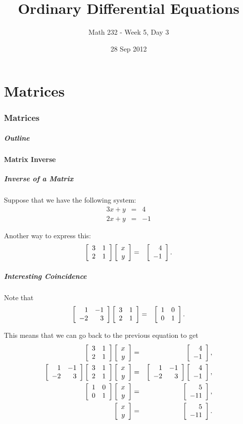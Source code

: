 \part{Matrices}
\section{Matrices}

\title{Ordinary Differential Equations}
\subtitle{Math 232 - Week 5, Day 3}
\date{28  Sep 2012}

\begin{frame}
  \titlepage
\end{frame}

\begin{frame}
  \frametitle{Outline}
\end{frame}


\subsection{Matrix Inverse}


\begin{frame}
  \frametitle{Inverse of a Matrix}

  Suppose that we have the following system:
  \begin{eqnarray*}
    3x + y & = & 4 \\
    2x + y & = & -1
  \end{eqnarray*}

  Another way to express this:
  \begin{eqnarray*}
    \arrayTwo{3}{1}{2}{1} \vecTwo{x}{y} & = & \vecTwo{4}{-1}.
  \end{eqnarray*}

\end{frame}


\begin{frame}
  \frametitle{Interesting Coincidence}

  Note that
  \begin{eqnarray*}
    \arrayTwo{1}{-1}{-2}{3} \arrayTwo{3}{1}{2}{1}  & = & \arrayTwo{1}{0}{0}{1}.
  \end{eqnarray*}

  This means that we can go back to the previous equation to get
  \begin{eqnarray*}
    \arrayTwo{3}{1}{2}{1} \vecTwo{x}{y} & = & \vecTwo{4}{-1}, \\
    \arrayTwo{1}{-1}{-2}{3} \arrayTwo{3}{1}{2}{1} \vecTwo{x}{y} & = & 
          \arrayTwo{1}{-1}{-2}{3}\vecTwo{4}{-1}, \\
    \arrayTwo{1}{0}{0}{1} \vecTwo{x}{y} & = & \vecTwo{5}{-11}, \\
    \vecTwo{x}{y} & = & \vecTwo{5}{-11}.
  \end{eqnarray*}


\end{frame}

